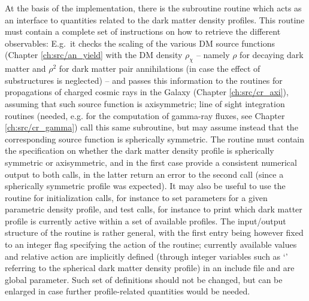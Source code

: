 At the basis of the implementation, there is the subroutine  routine which acts as an interface to quantities related to
the dark matter density profiles. This routine must contain a complete set of instructions on how to retrieve the different observables: E.g.~it checks the scaling of the various DM source functions (Chapter \ref{ch:src/an_yield}
with the DM density $\rho_\chi$ -- namely $\rho$ for decaying dark matter and $\rho^2$
for dark matter pair annihilations (in case the effect of substructures is neglected) -- and passes this information
to the routines for propagations of charged cosmic rays in the Galaxy (Chapter \ref{ch:src/cr_axi}), 
assuming that such source function is axisymmetric; line of sight integration routines (needed, e.g. for the computation of gamma-ray fluxes, see Chapter \ref{ch:src/cr_gamma})
call this same subroutine, but may assume instead that the corresponding source function is spherically symmetric. The routine 
 must contain the specification on whether the dark matter density profile is spherically symmetric 
or axisymmetric, and in the first case provide a consistent numerical output to both calls, in the latter return an error to the
second call (since a spherically symmetric profile was expected). It may also be useful to use the  routine for 
initialization calls, for instance to set parameters for a given parametric density profile, and test calls, for instance to print
which dark matter profile is currently active within a set of available profiles. The input/output structure of the routine is rather
general, with the first entry being however fixed to an integer flag specifying the action of the routine; currently 
available values and relative action are implicitly defined (through integer variables 
such as `' referring to the spherical dark matter density profile) in an include file and are global parameter. 
Such set of definitions should not be changed, but can be enlarged in case further profile-related quantities would be needed.

